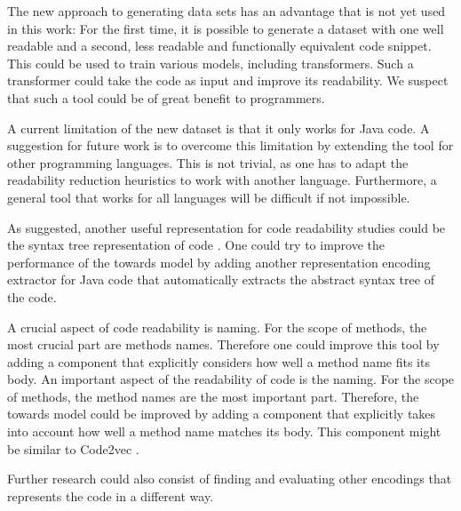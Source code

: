 \documentclass[%
class=scrreprt,
chapterprefix=false,%
open=right,%
twoside=false,%
paper=a4,%
logofile={Logo\_zentral\_farbig\_EN.png},%
thesistype=master,%
UKenglish,%
]{se2thesis}
\theoremstyle{definition}
\begin{document}
	The new approach to generating data sets has an advantage that is not yet used in this work: For the first time, it is possible to generate a dataset with one well readable and a second, less readable and functionally equivalent code snippet. This could be used to train various models, including transformers. Such a transformer could take the code as input and improve its readability. We suspect that such a tool could be of great benefit to programmers.
	
	A current limitation of the new dataset is that it only works for Java code. A suggestion for future work is to overcome this limitation by extending the tool for other programming languages. This is not trivial, as one has to adapt the readability reduction heuristics to work with another language. Furthermore, a general tool that works for all languages will be difficult if not impossible.
	
	
	As \citeauthor{mi2023graph} suggested, another useful representation for code readability studies could be the syntax tree representation of code \cite{mi2023graph}. One could try to improve the performance of the towards model by adding another representation encoding extractor for Java code that automatically extracts the abstract syntax tree of the code.
	
	A crucial aspect of code readability is naming. For the scope of methods, the most crucial part are methods names. Therefore one could improve this tool by adding a component that explicitly considers how well a method name fits its body.
	An important aspect of the readability of code is the naming. For the scope of methods, the method names are the most important part. Therefore, the towards model could be improved by adding a component that explicitly takes into account how well a method name matches its body. This component might be similar to Code2vec \cite{alon2019code2vec}.
	
	Further research could also consist of finding and evaluating other encodings that represents the code in a different way.
	
\end{document}
